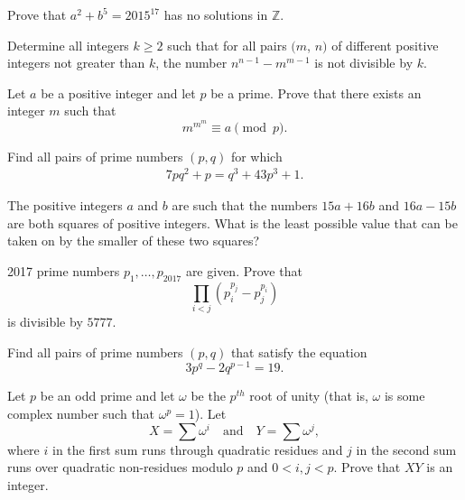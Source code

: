 \documentclass{subfile}
\begin{document}
	\begin{problem} %
		Prove that $a^{2}+b^{5}=2015^{17}$ has no solutions in $\mathbb{Z}$.
	\end{problem}
	
	\begin{problem} %
		Determine all integers $ k\ge 2$ such that for all pairs $ (m$, $ n)$ of different positive integers not greater than $ k$, the number $ n^{n-1}-m^{m-1}$ is not divisible by $ k$.
	\end{problem}
	
	\begin{problem}[ELMO 2000] %
		Let $a$ be a positive integer and let $p$ be a prime. Prove that there exists an integer $m$ such that \[ m^{m^m} \equiv a \pmod p. \]
	\end{problem}
	
	\begin{problem} %
		Find all pairs of prime numbers $(p,q)$ for which
		\begin{align*}
		7pq^2 + p = q^3 + 43p^3 + 1.
		\end{align*}
	\end{problem}
	
	\begin{problem} [IMO 1996] %
		The positive integers $ a$ and $ b$ are such that the numbers $ 15a + 16b$ and $ 16a - 15b$ are both squares of positive integers. What is the least possible value that can be taken on by the smaller of these two squares?
	\end{problem}
	
	\begin{problem} %
		2017 prime numbers $p_1,\ldots,p_{2017}$ are given. Prove that $$\prod_{i<j} (p_i^{p_j}-p_j^{p_i})$$ is divisible by $5777$.
	\end{problem}
	
	\begin{problem}[Ukraine 2014] %
		Find all pairs of prime numbers $(p,q)$ that satisfy the equation $$3p^{q}-2q^{p-1}=19.$$
	\end{problem}
	
	\begin{problem} %
		Let $p$ be an odd prime and let $\omega$ be the $p^{th}$ root of unity (that is, $\omega$ is some complex number such that $\omega^p = 1$). Let $$X=\sum \omega^i \quad \text{and} \quad Y=\sum \omega^j,$$ where $i$ in the first sum runs through quadratic residues and $j$ in the second sum runs over quadratic non-residues modulo $p$ and $0<i,j<p$. Prove that $XY$ is an integer.
	\end{problem}
	
\end{document}
